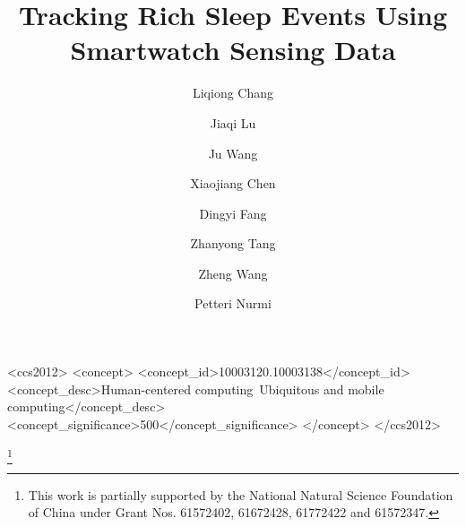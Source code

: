 \documentclass[acmlarge]{acmart}
\begin{document}
\title{Tracking Rich Sleep Events Using Smartwatch Sensing Data}

\author{Liqiong Chang}
\author{Jiaqi Lu}
\author{Ju Wang}
\author{Xiaojiang Chen}
\author{Dingyi Fang}
\author{Zhanyong Tang}
\author{Zheng Wang}
\author{Petteri Nurmi}




\begin{CCSXML}
	<ccs2012>
	<concept>
	<concept_id>10003120.10003138</concept_id>
	<concept_desc>Human-centered computing~Ubiquitous and mobile computing</concept_desc>
	<concept_significance>500</concept_significance>
	</concept>
	</ccs2012>
\end{CCSXML}



\thanks{This work is partially supported by the National Natural Science Foundation of China under Grant Nos. 61572402, 61672428, 61772422 and 61572347.}

\maketitle

\renewcommand{\shortauthors}{L. Chang, J. Lu, J. Wang, X. Chen, D. Fang, Z. Tang, Z. Wang, P. Nurmi}




%
%









\end{document}
